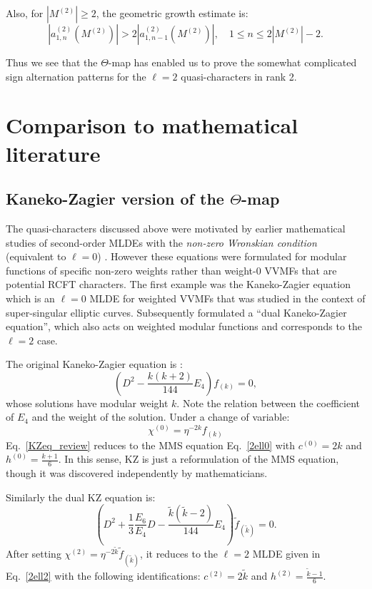 \documentclass[11pt]{article}
\newcommand\tk{{\tilde k}}
\newcommand\be{\begin{equation}}
\newcommand\ee{\end{equation}}
\begin{document}
Also, for \(|M^{(2)}|\ge2\), the geometric growth estimate is:
\be
        \left|a^{(2)}_{1,n}(M^{(2)})\right|
        >
        2\left|a^{(2)}_{1,n-1}(M^{(2)})\right|,
        \quad 1\le n\le2|M^{(2)}|-2.
\ee

Thus we see that the $\Theta$-map has enabled us to prove the somewhat complicated sign alternation patterns for the $\ell=2$ quasi-characters in rank 2.

\section{Comparison to mathematical literature}

\subsection{Kaneko-Zagier version of the $\Theta$-map}

The quasi-characters discussed above were motivated by earlier mathematical
studies of second-order MLDEs with the {\it non-zero Wronskian condition} (equivalent to $\ell=0$) \cite{KZ,KK,Kaneko:On}. However these equations were formulated for modular functions of specific non-zero weights rather than weight-0 VVMFs that are potential RCFT characters. The first example was the Kaneko-Zagier equation \cite{KZ} which is an $\ell=0$ MLDE for weighted VVMFs  that was studied in the context of super-singular elliptic curves. Subsequently \cite{Chandra:2018pjq} formulated  a ``dual Kaneko-Zagier equation'', which also acts on weighted modular functions and corresponds to the $\ell=2$ case.
 
 
The original Kaneko-Zagier equation is \cite{KZ}:
\begin{equation}
    \left(
        D^2-\frac{k(k+2)}{144}E_4
    \right)f_{(k)}=0,
    \label{KZeq_review}
\end{equation}
whose solutions have modular weight \(k\). Note the relation between the coefficient of $E_4$ and the weight of the solution. 
Under a change of variable:
\be
\chi^{(0)}=\eta^{-2k}f_{(k)}
\label{chvar}
\ee
Eq.~\eqref{KZeq_review} reduces to the MMS equation Eq.~\eqref{2ell0} with $c^{(0)}=2k$ and $h^{(0)}=\frac{k+1}{6}$. In this sense, KZ is just a reformulation of the MMS equation, though it was discovered independently by mathematicians.

Similarly the dual KZ equation is:
\begin{equation}
    \left(
        D^{2}
        +\frac{1}{3}\frac{E_6}{E_4}D
        -\frac{\widetilde k(\tk-2)}{144}E_4
    \right)\widetilde f_{(\tk)}=0.
    \label{dualKZeq_review}
\end{equation}
After setting
\(
\chi^{(2)}=\eta^{-2\tk}\widetilde f_{(\tk)}
\),
it reduces to the $\ell=2$ MLDE given in Eq.~\eqref{2ell2} with the following identifications: $c^{(2)}=2\tk$ and $h^{(2)}=\frac{\tk-1}{6}$.
\end{document}
